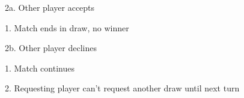 \documentclass[letterpaper,11pt]{article}
\begin{document}
\begin{list}{}{}
\begin{list}{}{}
\begin{list}{}{}
					\item \begin{list}{}{}
							\item 2a. Other player accepts
							\item \begin{list}{}{}
									\item 1. Match ends in draw, no winner
								\end{list}
							\item 2b. Other player declines
							\item \begin{list}{}{}
									\item 1. Match continues
									\item 2. Requesting player can't request another draw until next turn
								\end{list}
						\end{list}
				\end{list}
		\end{list}
\end{list}
\end{document}
